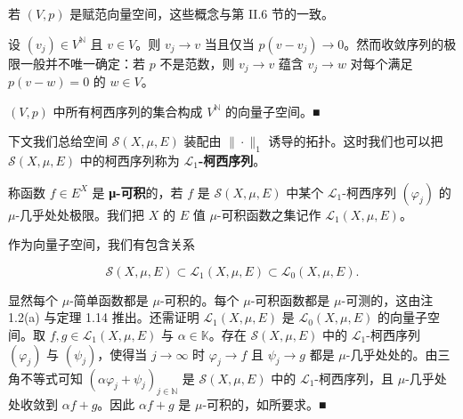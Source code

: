 \begin{remark}

\begin{items}
\item

若 $ (V,p) $ 是赋范向量空间，这些概念与第 II.6 节的一致。

\item

设 $ (v_j) \in V^{\mathbb{N}} $ 且 $ v \in V $。则 $ v_j \to v $ 当且仅当 $ p(v - v_j) \to 0 $。然而收敛序列的极限一般并不唯一确定：若 $ p $ 不是范数，则 $ v_j \to v $ 蕴含 $ v_j \to w $ 对每个满足 $ p(v - w) = 0 $ 的 $ w \in V $。

\item

$ (V,p) $ 中所有柯西序列的集合构成 $ V^{\mathbb{N}} $ 的向量子空间。\nobreak\hspace{0.35em}■

\end{items}

下文我们总给空间 $ \mathcal{S}(X,\mu,E) $ 装配由 $ \|\cdot\|_1 $ 诱导的拓扑。这时我们也可以把 $ \mathcal{S}(X,\mu,E) $ 中的柯西序列称为 \textbf{$ \mathcal{L}_1 $-柯西序列}。

称函数 $ f \in E^{X} $ 是 \textbf{μ-可积}的，若 $ f $ 是 $ \mathcal{S}(X,\mu,E) $ 中某个 $ \mathcal{L}_1 $-柯西序列 $ (\varphi_j) $ 的 $ \mu $-几乎处处极限。我们把 $ X $ 的 $ E $ 值 $ \mu $-可积函数之集记作 $ \mathcal{L}_1(X,\mu,E) $。

\end{remark}

\begin{proposition}

作为向量子空间，我们有包含关系

\[
\mathcal{S}(X,\mu,E) \subset \mathcal{L}_1(X,\mu,E) \subset \mathcal{L}_0(X,\mu,E) .
\]

\proofhead
显然每个 $ \mu $-简单函数都是 $ \mu $-可积的。每个 $ \mu $-可积函数都是 $ \mu $-可测的，这由注 1.2(a) 与定理 1.14 推出。还需证明 $ \mathcal{L}_1(X,\mu,E) $ 是 $ \mathcal{L}_0(X,\mu,E) $ 的向量子空间。取 $ f, g \in \mathcal{L}_1(X,\mu,E) $ 与 $ \alpha \in \mathbb{K} $。存在 $ \mathcal{S}(X,\mu,E) $ 中的 $ \mathcal{L}_1 $-柯西序列 $ (\varphi_j) $ 与 $ (\psi_j) $，使得当 $ j \to \infty $ 时 $ \varphi_j \to f $ 且 $ \psi_j \to g $ 都是 $ \mu $-几乎处处的。由三角不等式可知 $ (\alpha \varphi_j + \psi_j)_{j \in \mathbb{N}} $ 是 $ \mathcal{S}(X,\mu,E) $ 中的 $ \mathcal{L}_1 $-柯西序列，且 $ \mu $-几乎处处收敛到 $ \alpha f + g $。因此 $ \alpha f + g $ 是 $ \mu $-可积的，如所要求。\nobreak\hspace{0.35em}■
\end{proposition}

